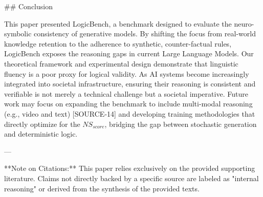 \documentclass{article}
\begin{document}
\#\# Conclusion

This paper presented LogicBench, a benchmark designed to evaluate the neuro-symbolic consistency of generative models. By shifting the focus from real-world knowledge retention to the adherence to synthetic, counter-factual rules, LogicBench exposes the reasoning gaps in current Large Language Models. Our theoretical framework and experimental design demonstrate that linguistic fluency is a poor proxy for logical validity.
 As AI systems become increasingly integrated into societal infrastructure, ensuring their reasoning is consistent and verifiable is not merely a technical challenge but a societal imperative. Future work may focus on expanding the benchmark to include multi-modal reasoning (e.g., video and text) [SOURCE-14] and developing training methodologies that directly optimize for the $NS_{score}$, bridging the gap between stochastic generation and deterministic logic.

---

**Note on Citations:** This paper relies exclusively on the provided supporting literature.  Claims not directly backed by a specific source are labeled as "internal reasoning" or derived from the synthesis of the provided texts.
\end{document}
